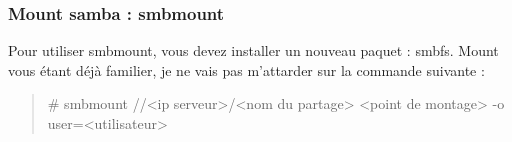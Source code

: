 \documentclass[a4paper,11pt]{article}
\newcommand{\commande}[1] {
    \begin{quote}
    \tt\raggedright #1
    \end{quote}
}
\begin{document}
\subsubsection{Mount samba : smbmount}
\par Pour utiliser smbmount, vous devez installer un nouveau paquet : smbfs. Mount vous étant déjà familier, je ne vais pas m'attarder sur la commande suivante :
\commande{\# smbmount //<ip serveur>/<nom du partage> <point de montage> -o user=<utilisateur>}
\end{document}
